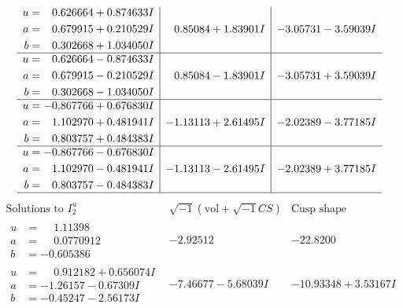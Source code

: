 \documentclass[1p]{elsarticle_modified}
\theoremstyle{definition}
\newcommand{\I}{\sqrt{-1}}
\begin{document}
$$\begin{array}{c|c|c}
\begin{aligned}
u &= \phantom{-}0.626664 + 0.874633 I \\
a &= \phantom{-}0.679915 + 0.210529 I \\
b &= \phantom{-}0.302668 + 1.034050 I\end{aligned}
 & \phantom{-}0.85084 + 1.83901 I & -3.05731 - 3.59039 I \\ \hline\begin{aligned}
u &= \phantom{-}0.626664 - 0.874633 I \\
a &= \phantom{-}0.679915 - 0.210529 I \\
b &= \phantom{-}0.302668 - 1.034050 I\end{aligned}
 & \phantom{-}0.85084 - 1.83901 I & -3.05731 + 3.59039 I \\ \hline\begin{aligned}
u &= -0.867766 + 0.676830 I \\
a &= \phantom{-}1.102970 + 0.481941 I \\
b &= \phantom{-}0.803757 + 0.484383 I\end{aligned}
 & -1.13113 + 2.61495 I & -2.02389 - 3.77185 I \\ \hline\begin{aligned}
u &= -0.867766 - 0.676830 I \\
a &= \phantom{-}1.102970 - 0.481941 I \\
b &= \phantom{-}0.803757 - 0.484383 I\end{aligned}
 & -1.13113 - 2.61495 I & -2.02389 + 3.77185 I\\
 \hline 
 \end{array}$$\newpage$$\begin{array}{c|c|c}  
\text{Solutions to }I^u_{2}& \I (\text{vol} + \sqrt{-1}CS) & \text{Cusp shape}\\
 \hline 
\begin{aligned}
u &= \phantom{-}1.11398\phantom{ +0.000000I} \\
a &= \phantom{-}0.0770912\phantom{ +0.000000I} \\
b &= -0.605386\phantom{ +0.000000I}\end{aligned}
 & -2.92512\phantom{ +0.000000I} & -22.8200\phantom{ +0.000000I} \\ \hline\begin{aligned}
u &= \phantom{-}0.912182 + 0.656074 I \\
a &= -1.26157 - 0.67309 I \\
b &= -0.45247 - 2.56173 I\end{aligned}
 & -7.46677 - 5.68039 I & -10.93348 + 3.53167 I \\ \hline\begin{aligned}

\end{aligned}
\end{array}$$
\end{document}
